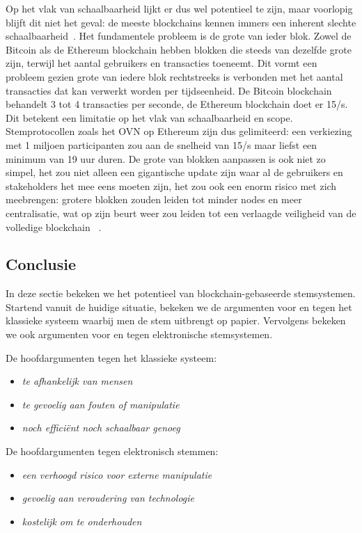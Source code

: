 	 Op het vlak van schaalbaarheid lijkt er dus wel potentieel te zijn, maar voorlopig blijft dit niet het geval: de meeste blockchains kennen immers een inherent slechte schaalbaarheid~\autocite{Blenkinsop2018}. Het fundamentele probleem is de grote van ieder blok. Zowel de Bitcoin als de Ethereum blockchain hebben blokken die steeds van dezelfde grote zijn, terwijl het aantal gebruikers en transacties toeneemt. Dit vormt een probleem gezien grote van iedere blok rechtstreeks is verbonden met het aantal transacties dat kan verwerkt worden per tijdseenheid. De Bitcoin blockchain behandelt 3 tot 4 transacties per seconde, de Ethereum blockchain doet er 15/s. Dit betekent een limitatie op het vlak van schaalbaarheid en scope. Stemprotocollen zoals het OVN op Ethereum zijn dus gelimiteerd: een verkiezing met 1 miljoen participanten zou aan de snelheid van 15/s maar liefst een minimum van 19 uur duren. De grote van blokken aanpassen is ook niet zo simpel, het zou niet alleen een gigantische update zijn waar al de gebruikers en stakeholders het mee eens moeten zijn, het zou ook een enorm risico met zich meebrengen:  grotere blokken zouden leiden tot minder nodes en meer centralisatie, wat op zijn beurt weer zou leiden tot een verlaagde veiligheid van de volledige blockchain ~\autocite{Blenkinsop2018}.

	\subsection{Conclusie} 
	In deze sectie bekeken we het potentieel van blockchain-gebaseerde stemsystemen. Startend vanuit de huidige situatie, bekeken we de argumenten voor en tegen het klassieke systeem waarbij men de stem uitbrengt op papier. Vervolgens bekeken we ook argumenten voor en tegen elektronische stemsystemen.  
	
	De hoofdargumenten tegen het klassieke systeem:
	\begin{itemize}
		\item\textit{te afhankelijk van mensen}
		\item\textit{te gevoelig aan fouten of manipulatie}
		\item\textit{noch efficiënt noch schaalbaar genoeg}
	\end{itemize}
	
	De hoofdargumenten tegen elektronisch stemmen:
	
	\begin{itemize}
		\item\textit{een verhoogd risico voor externe manipulatie}
		\item\textit{gevoelig aan veroudering van technologie}
		\item\textit{kostelijk om te onderhouden}
	\end{itemize}
	
